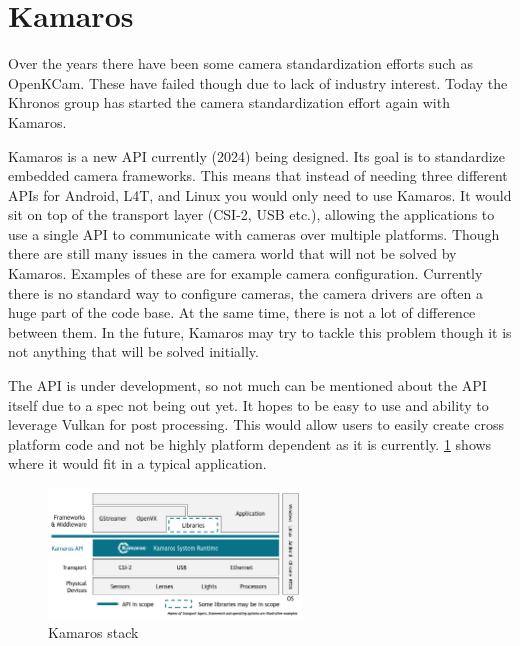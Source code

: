 \section{Kamaros}
Over the years there have been some camera standardization efforts such as
OpenKCam. These have failed though due to lack of industry interest. Today
the Khronos group has started the camera standardization effort again with
Kamaros.

Kamaros is a new API currently (2024) being designed. Its goal is to
standardize embedded camera frameworks. This means that instead of needing
three different APIs for Android, L4T, and Linux you would only need to use
Kamaros. It would sit on top of the transport layer (CSI-2, USB etc.), allowing
the applications to use a single API to communicate with cameras over multiple
platforms. Though there are still many issues in the camera world that will not
be solved by Kamaros. Examples of these are for example camera configuration.
Currently there is no standard way to configure cameras, the camera drivers are
often a huge part of the code base. At the same time, there is not a lot of
difference between them. In the future, Kamaros may try to tackle this problem
though it is not anything that will be solved initially.

The API is under development, so not much can be mentioned about the API itself
due to a spec not being out yet. It hopes to be easy to use and ability to
leverage Vulkan for post processing. This would allow users to easily create
cross platform code and not be highly platform dependent as it is currently.
\cref{fig:kamaros_stack} shows where it would fit in a typical application.

\begin{figure}
    \begin{center}
        \includegraphics[width=0.60\textwidth]{figures/kamaros_stack.png}
    \end{center}
    \caption[Kamaros stack]{Kamaros stack\footnotemark}\label{fig:kamaros_stack}
\end{figure}

